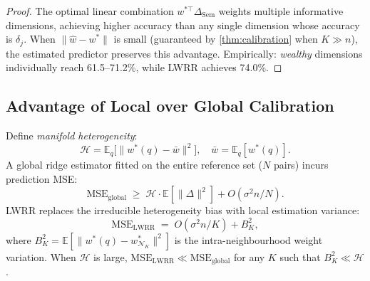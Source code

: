\documentclass[runningheads]{llncs}
\begin{document}
\begin{proof}
The optimal linear combination $w^{*\!\top}\Delta_{\text{Sem}}$ weights multiple informative dimensions, achieving higher accuracy than any single dimension whose accuracy is $\delta_j$.
When $\|\hat{w} - w^{*}\|$ is small (guaranteed by \cref{thm:calibration} when $K \gg n$), the estimated predictor preserves this advantage.
Empirically: \emph{wealthy} dimensions individually reach 61.5--71.2\%, while LWRR achieves 74.0\%.
\end{proof}

\subsection{Advantage of Local over Global Calibration}
\label{sec:theory_local}

\begin{theorem}\label{thm:local_global}
Define \emph{manifold heterogeneity}:
\begin{equation}
\mathcal{H} = \mathbb{E}_{q}\bigl[\|w^{*\!}(q) - \bar{w}\|^2\bigr], \quad \bar{w} = \mathbb{E}_{q}[w^{*\!}(q)].
\label{eq:heterogeneity}
\end{equation}
A global ridge estimator fitted on the entire reference set ($N$ pairs) incurs prediction MSE:
\begin{equation}
\mathrm{MSE}_{\mathrm{global}} \;\geq\; \mathcal{H}\cdot\mathbb{E}[\|\Delta\|^2] + O(\sigma^2 n / N).
\end{equation}
LWRR replaces the irreducible heterogeneity bias with local estimation variance:
\begin{equation}
\mathrm{MSE}_{\mathrm{LWRR}} \;=\; O(\sigma^2 n / K) + B_K^2,
\end{equation}
where $B_K^2 = \mathbb{E}[\|w^{*\!}(q) - w^{*}_{\mathcal{N}_K}\|^2]$ is the intra-neighbourhood weight variation.
When $\mathcal{H}$ is large, $\mathrm{MSE}_{\mathrm{LWRR}} \ll \mathrm{MSE}_{\mathrm{global}}$ for any $K$ such that $B_K^2 \ll \mathcal{H}$.
\end{theorem}
\end{document}

